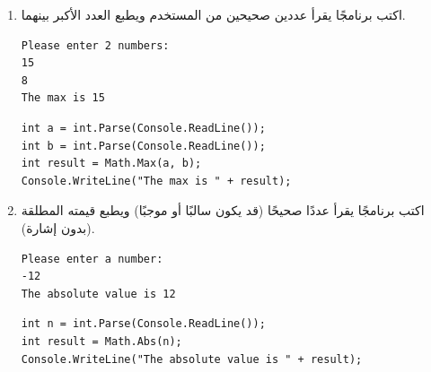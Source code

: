 \documentclass[14pt]{extarticle}
\begin{document}
\begin{enumerate}[itemsep=3em]
    \item
    اكتب برنامجًا يقرأ عددين صحيحين من المستخدم ويطبع العدد الأكبر بينهما.
    \ifdetailed
    \begin{boxExample}
    \begin{english}
    \begin{verbatim}
Please enter 2 numbers:
15
8
The max is 15
    \end{verbatim}
    \end{english}
    \end{boxExample}
    \ifwithsols
    \begin{boxSolution}
    \begin{english}
    \begin{verbatim}
int a = int.Parse(Console.ReadLine());
int b = int.Parse(Console.ReadLine());
int result = Math.Max(a, b);
Console.WriteLine("The max is " + result);
    \end{verbatim}
    \end{english}
    \end{boxSolution}
    \fi
    \fi

    \item
    اكتب برنامجًا يقرأ عددًا صحيحًا (قد يكون سالبًا أو موجبًا) ويطبع قيمته المطلقة (بدون إشارة).
    \ifdetailed
    \begin{boxExample}
    \begin{english}
    \begin{verbatim}
Please enter a number:
-12
The absolute value is 12
    \end{verbatim}
    \end{english}
    \end{boxExample}
    \ifwithsols
    \begin{boxSolution}
    \begin{english}
    \begin{verbatim}
int n = int.Parse(Console.ReadLine());
int result = Math.Abs(n);
Console.WriteLine("The absolute value is " + result);
    \end{verbatim}
    \end{english}
    \end{boxSolution}
    \clearpage
    \fi
    \fi


\end{enumerate}
\end{document}
